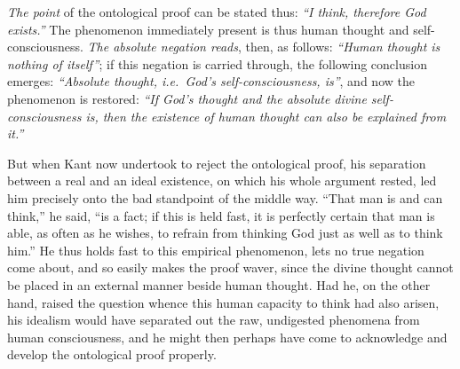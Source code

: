 \documentclass[12pt]{book}
\newcommand{\opage}[1]{\marginnote{\footnotesize\textit{[#1]}}}
\begin{document}
\emph{The point} of the ontological proof can be stated thus: \emph{``I think,
therefore God exists.''} The phenomenon immediately present is thus human
thought and self-consciousness. \emph{The absolute negation reads}, then, as
follows: \emph{``Human thought is nothing of itself''}; if this negation is
carried through, the following conclusion emerges: \emph{``Absolute thought,
i.e.\ God's self-consciousness, is''}, and now the phenomenon is restored:
\emph{``If God's thought and the absolute divine self-consciousness is, then the
existence of human thought can also be explained from it.''}

But when Kant now undertook to reject the ontological proof, his separation
between a real and an ideal existence, on which his whole argument rested, led
him precisely onto the bad standpoint of the middle way. ``That man is and can
think,'' he said, ``is a fact; if this is held fast, it is perfectly certain
that man is able, as often as he wishes, to refrain from thinking God just as
well as to think him.'' He thus holds fast to this empirical phenomenon, lets no
true negation come about, and so easily makes the proof waver, since the divine
thought cannot be placed in an external manner beside human thought. Had he, on
the other hand, raised the question whence this human capacity to think had
also arisen, his idealism would have separated out the raw, undigested
phenomena from human
\opage{23} consciousness, and he might then perhaps have come to acknowledge and develop
the ontological proof properly.
\end{document}
